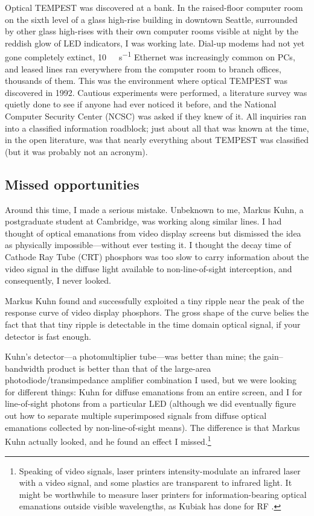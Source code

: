 \documentclass[conference]{IEEEtran}
\begin{document}
Optical TEMPEST was discovered at a bank. In the raised-floor computer room
on the sixth level of a glass high-rise building in downtown Seattle,
surrounded by other glass high-rises with their own computer rooms visible at
night by the reddish glow of LED indicators, I was working late. Dial-up
modems had not yet gone completely extinct, \SI{10}{\mega\bit\per\second}
Ethernet was increasingly common on PCs, and leased lines ran everywhere from
the computer room to branch offices, thousands of them. This was the
environment where optical TEMPEST was discovered in 1992. Cautious
experiments were performed, a literature survey was quietly done to see if
anyone had ever noticed it before, and the National Computer Security Center
(NCSC) was asked if they knew of it. All inquiries ran into a classified
information roadblock; just about all that was known at the time, in the open
literature, was that nearly everything about TEMPEST was classified (but it
was probably not an acronym).

\subsection{Missed opportunities}

Around this time, I made a serious mistake. Unbeknown to me, Markus Kuhn, a
postgraduate student at Cambridge, was working along similar lines. I had
thought of optical emanations from video display screens but dismissed the
idea as physically impossible---without ever testing it. I thought the decay
time of Cathode Ray Tube (CRT) phosphors was too slow to carry information
about the video signal in the diffuse light available to non-line-of-sight
interception, and consequently, I never looked.

Markus Kuhn found and successfully exploited a tiny ripple near the peak of
the response curve of video display phosphors. The gross shape of the curve
belies the fact that that tiny ripple is detectable in the time domain
optical signal, if your detector is fast enough.

Kuhn's detector---a photomultiplier tube---was better than mine; the
gain--bandwidth product is better than that of the large-area
photodiode/transimpedance amplifier combination I used, but we were looking
for different things: Kuhn for diffuse emanations from an entire screen, and
I for line-of-sight photons from a particular LED (although we did eventually
figure out how to separate multiple superimposed signals from diffuse optical
emanations collected by non-line-of-sight means). The difference is that
Markus Kuhn actually looked, and he found an effect I
missed.\footnote{Speaking of video signals, laser printers intensity-modulate
an infrared laser with a video signal, and some plastics are transparent to
infrared light. It might be worthwhile to measure laser printers for
information-bearing optical emanations outside visible wavelengths, as Kubiak
has done for RF \cite{Kubiak2014,Kubiak2017,Kubiak2017b,Kubiak2017c}.}
\end{document}
